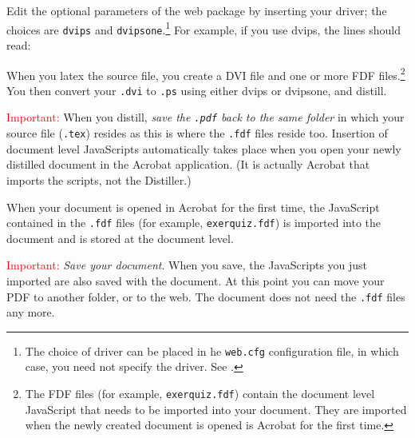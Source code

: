 \documentclass{article}
\begin{document}

Edit the optional parameters of the \textsf{web} package by inserting your driver; the choices are
\texttt{dvips} and \texttt{dvipsone}.\footnote{The choice of driver can be placed in he \texttt{web.cfg} configuration file, in which
case, you need not specify the driver. See .} For example, if you use \textsf{dvips}, the
lines should read:

\begingroup\raggedright
\noindent When you latex the source file, you create a DVI file and one or more FDF files.\footnote{The FDF files (for example, \texttt{exerquiz.fdf}) contain the document level JavaScript that needs to be imported into your document. They are imported when the newly
created document is opened is Acrobat for the first time.}
You then convert your \texttt{.dvi} to \texttt{.ps} using either
\textsf{dvips} or \textsf{dvipsone}, and distill.
\par\endgroup

\newtopic\textcolor{red}{Important:} When you distill, \emph{save the
\emph{\texttt{.pdf}} back to the same folder} in which your source file
(\texttt{.tex}) resides as this is where the \texttt{.fdf} files
reside too. Insertion of document level JavaScripts automatically
takes place when you open your newly distilled document
in the \textsf{Acrobat} application. (It is actually
\textsf{Acrobat} that imports the scripts, not the
\textsf{Distiller}.)

\handpoint  When your document is opened in \textsf{Acrobat} for
the first time, the Java\-Script contained in the \texttt{.fdf} files
(for example, \texttt{exerquiz.fdf}) is imported into the document
and is stored at the document level.

\redpoint \textcolor{red}{Important:} \emph{Save your document}. When you
save, the JavaScripts you just imported are also saved with the
document. At this point you can move your \textsf{PDF} to another
folder, or to the web. The document does not need the
\texttt{.fdf} files any more.
\end{document}
